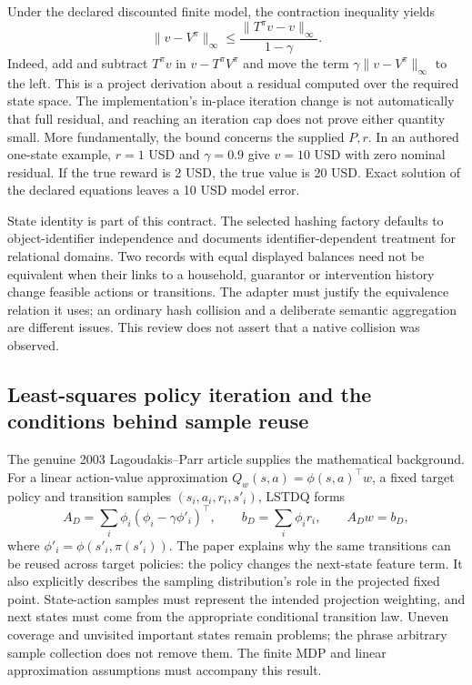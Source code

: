 Under the declared discounted finite model, the contraction inequality yields
\[
 \|v-V^\pi\|_\infty\leq
 \frac{\|T^\pi v-v\|_\infty}{1-\gamma}.
\]
Indeed, add and subtract $T^\pi v$ in $v-T^\pi V^\pi$ and move the term $\gamma\|v-V^\pi\|_\infty$ to the left. This is a project derivation about a residual computed over the required state space. The implementation's in-place iteration change is not automatically that full residual, and reaching an iteration cap does not prove either quantity small. More fundamentally, the bound concerns the supplied $P,r$. In an authored one-state example, $r=1$ USD and $\gamma=0.9$ give $v=10$ USD with zero nominal residual. If the true reward is 2 USD, the true value is 20 USD. Exact solution of the declared equations leaves a 10 USD model error.\citep{exec24_policyjava_comparison}

State identity is part of this contract. The selected hashing factory defaults to object-identifier independence and documents identifier-dependent treatment for relational domains. Two records with equal displayed balances need not be equivalent when their links to a household, guarantor or intervention history change feasible actions or transitions. The adapter must justify the equivalence relation it uses; an ordinary hash collision and a deliberate semantic aggregation are different issues. This review does not assert that a native collision was observed.\citep{exec24_policyjava_burlap}

\subsection{Least-squares policy iteration and the conditions behind sample reuse}
The genuine 2003 Lagoudakis--Parr article supplies the mathematical background. For a linear action-value approximation $Q_w(s,a)=\phi(s,a)^\top w$, a fixed target policy and transition samples $(s_i,a_i,r_i,s'_i)$, LSTDQ forms
\[
 A_D=\sum_i\phi_i(\phi_i-\gamma\phi'_i)^\top,
 \qquad b_D=\sum_i\phi_i r_i,
 \qquad A_Dw=b_D,
\]
where $\phi'_i=\phi(s'_i,\pi(s'_i))$. The paper explains why the same transitions can be reused across target policies: the policy changes the next-state feature term. It also explicitly describes the sampling distribution's role in the projected fixed point. State-action samples must represent the intended projection weighting, and next states must come from the appropriate conditional transition law. Uneven coverage and unvisited important states remain problems; the phrase arbitrary sample collection does not remove them. The finite MDP and linear approximation assumptions must accompany this result.\citep{exec24_policyjava_lspi}

